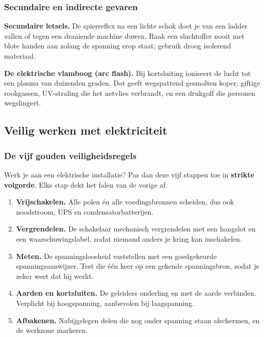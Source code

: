 \documentclass[a4paper,11pt]{article}
\begin{document}
\subsubsection{Secundaire en indirecte gevaren}

\textbf{Secundaire letsels.} De spierreflex na een lichte schok doet je van een ladder vallen of
tegen een draaiende machine duwen. Raak een slachtoffer nooit met blote handen aan zolang de
spanning erop staat; gebruik droog isolerend materiaal.

\textbf{De elektrische vlamboog (arc flash).} Bij kortsluiting ioniseert de lucht tot een plasma van
duizenden graden. Dat geeft wegspattend gesmolten koper, giftige rookgassen, UV-straling die het
netvlies verbrandt, en een drukgolf die personen wegslingert.

\subsection{Veilig werken met elektriciteit}

\subsubsection{De vijf gouden veiligheidsregels}

Werk je aan een elektrische installatie? Pas dan deze vijf stappen toe in \textbf{strikte volgorde}.
Elke stap dekt het falen van de vorige af.

\begin{enumerate}
    \item \textbf{Vrijschakelen.} Alle polen \'en alle voedingsbronnen scheiden, dus ook
          noodstroom, UPS en condensatorbatterijen.
    \item \textbf{Vergrendelen.} De schakelaar mechanisch vergrendelen met een hangslot en een
          waarschuwingslabel, zodat niemand anders je kring kan inschakelen.
    \item \textbf{Meten.} De spanningsloosheid vaststellen met een goedgekeurde spanningsaanwijzer.
          Test die \'e\'en keer op een gekende spanningsbron, zodat je zeker weet dat hij werkt.
    \item \textbf{Aarden en kortsluiten.} De geleiders onderling en met de aarde verbinden.
          Verplicht bij hoogspanning, aanbevolen bij laagspanning.
    \item \textbf{Afbakenen.} Nabijgelegen delen die nog onder spanning staan afschermen, en de
          werkzone markeren.
\end{enumerate}
\end{document}
